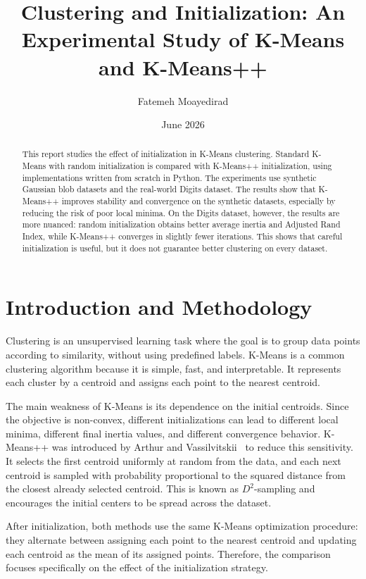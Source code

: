 \documentclass[11pt]{article}
\title{\vspace{-1.0cm}\textbf{Clustering and Initialization: An Experimental Study of K-Means and K-Means++}}
\author{Fatemeh Moayedirad}
\date{June 2026}
\begin{document}
\maketitle
\vspace{-0.5cm}

\begin{abstract}
This report studies the effect of initialization in K-Means clustering. Standard K-Means with random initialization is compared with K-Means++ initialization, using implementations written from scratch in Python. The experiments use synthetic Gaussian blob datasets and the real-world Digits dataset. The results show that K-Means++ improves stability and convergence on the synthetic datasets, especially by reducing the risk of poor local minima. On the Digits dataset, however, the results are more nuanced: random initialization obtains better average inertia and Adjusted Rand Index, while K-Means++ converges in slightly fewer iterations. This shows that careful initialization is useful, but it does not guarantee better clustering on every dataset.
\end{abstract}

\section{Introduction and Methodology}
Clustering is an unsupervised learning task where the goal is to group data points according to similarity, without using predefined labels. K-Means is a common clustering algorithm because it is simple, fast, and interpretable. It represents each cluster by a centroid and assigns each point to the nearest centroid.

The main weakness of K-Means is its dependence on the initial centroids. Since the objective is non-convex, different initializations can lead to different local minima, different final inertia values, and different convergence behavior. K-Means++ was introduced by Arthur and Vassilvitskii~\cite{arthur2007kmeanspp} to reduce this sensitivity. It selects the first centroid uniformly at random from the data, and each next centroid is sampled with probability proportional to the squared distance from the closest already selected centroid. This is known as \(D^2\)-sampling and encourages the initial centers to be spread across the dataset.

After initialization, both methods use the same K-Means optimization procedure: they alternate between assigning each point to the nearest centroid and updating each centroid as the mean of its assigned points. Therefore, the comparison focuses specifically on the effect of the initialization strategy.
\end{document}
